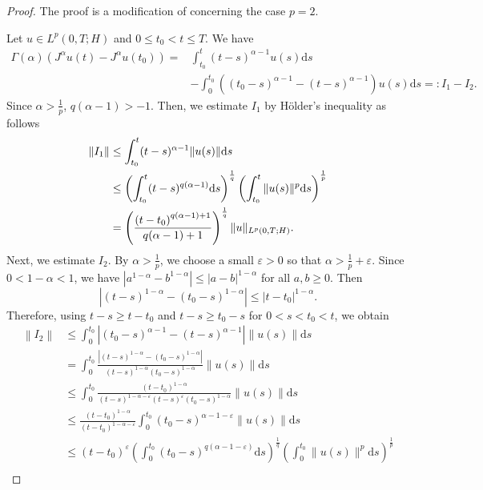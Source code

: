 \documentclass[reqno]{amsart}
\numberwithin{equation}{section}
\def \d {\mathrm{d}}
\begin{document}
\begin{proof}
The proof is a modification of \cite[Theorem 2.1.4]{Ya25} concerning the case $p=2$.

Let $u\in L^p(0,T;H)$ and $0 \leq t_0<t \leq T$. We have
\begin{align*}
\Gamma(\alpha)\left(J^\alpha u(t)-J^\alpha u(t_0)\right)= & \int_{t_0}^t(t-s)^{\alpha-1} u(s) \d s \\
& -\int_0^{t_0}\left(\left(t_0-s\right)^{\alpha-1}-(t-s)^{\alpha-1}\right) u(s) \d s=: I_1-I_2.
\end{align*}
Since $\alpha>\frac{1}{p}$, $q(\alpha-1)>-1$. Then, we estimate $I_1$ by Hölder's inequality as follows
\begin{align}
\left\|I_1\right\| & \leq \int_{t_0}^t(t-s)^{\alpha-1}\|u(s)\| \d s \notag\\
& \leq\left(\int_{t_0}^t(t-s)^{q(\alpha-1)} \d s\right)^{\frac{1}{q}}\left(\int_{t_0}^t\|u(s)\|^p \d s\right)^{\frac{1}{p}} \notag\\
&=\left(\frac{\left(t-t_0\right)^{q(\alpha-1)+1}}{q(\alpha-1)+1}\right)^{\frac{1}{q}}\|u\|_{L^p(0, T ; H)}. \label{I1}
\end{align}
Next, we estimate $I_2$. By $\alpha>\frac{1}{p}$, we choose a small $\varepsilon>0$ so that $\alpha>\frac{1}{p}+\varepsilon$. Since $0<1-\alpha<1$, we have $\left|a^{1-\alpha}-b^{1-\alpha}\right| \leq|a-b|^{1-\alpha}$ for all $a, b \geq 0$. Then
$$
\left|(t-s)^{1-\alpha}-\left(t_0-s\right)^{1-\alpha}\right| \leq \left|t-t_0\right|^{1-\alpha}.
$$
Therefore, using $t-s \geq t-t_0$ and $t-s \geq t_0-s$ for $0<s<t_0<t$, we obtain
\begin{align*}
\left\|I_2\right\| & \leq \int_0^{t_0}\left|\left(t_0-s\right)^{\alpha-1}-(t-s)^{\alpha-1}\right|\|u(s)\| \d s \\
& =\int_0^{t_0} \frac{\left|(t-s)^{1-\alpha}-\left(t_0-s\right)^{1-\alpha}\right|}{(t-s)^{1-\alpha}\left(t_0-s\right)^{1-\alpha}}\|u(s)\| \d s \\
& \leq \int_0^{t_0} \frac{\left(t-t_0\right)^{1-\alpha}}{(t-s)^{1-\alpha-\varepsilon}(t-s)^{\varepsilon}\left(t_0-s\right)^{1-\alpha}}\|u(s)\| \d s \\
& \leq \frac{\left(t-t_0\right)^{1-\alpha}}{\left(t-t_0\right)^{1-\alpha-\varepsilon}} \int_0^{t_0}\left(t_0-s\right)^{\alpha-1-\varepsilon}\|u(s)\| \d s\\
& \leq\left(t-t_0\right)^{\varepsilon}\left(\int_0^{t_0}\left(t_0-s\right)^{q(\alpha-1-\varepsilon)} \d s\right)^{\frac{1}{q}}\left(\int_0^{t_0}\|u(s)\|^p \d s\right)^{\frac{1}{p}} \\

\end{align*}
\end{proof}
\end{document}
